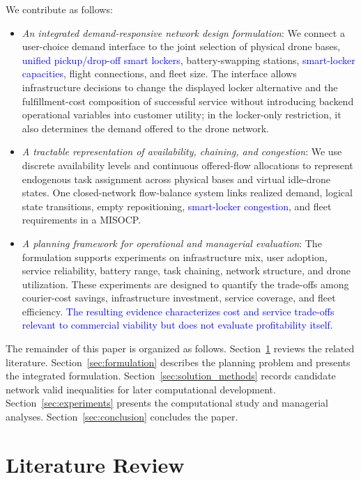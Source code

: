 \documentclass[final,3p,authoryear]{elsarticle}
\begin{document}
\color{black}
We contribute as follows:
\begin{itemize}
    \item \textit{An integrated demand-responsive network design formulation}:
    We connect a user-choice demand interface to the joint selection of physical drone bases, \textcolor{blue}{unified pickup/drop-off smart lockers}, battery-swapping stations, \textcolor{blue}{smart-locker capacities}, flight connections, and fleet size.
    The interface allows infrastructure decisions to change the displayed locker alternative and the fulfillment-cost composition of successful service without introducing backend operational variables into customer utility; in the locker-only restriction, it also determines the demand offered to the drone network.
    \item \textit{A tractable representation of availability, chaining, and congestion}:
    We use discrete availability levels and continuous offered-flow allocations to represent endogenous task assignment across physical bases and virtual idle-drone states.
    One closed-network flow-balance system links realized demand, logical state transitions, empty repositioning, \textcolor{blue}{smart-locker congestion}, and fleet requirements in a MISOCP.
    \item \textit{A planning framework for operational and managerial evaluation}:
    The formulation supports experiments on infrastructure mix, user adoption, service reliability, battery range, task chaining, network structure, and drone utilization.
    These experiments are designed to quantify the trade-offs among courier-cost savings, infrastructure investment, service coverage, and fleet efficiency.
    \textcolor{blue}{The resulting evidence characterizes cost and service trade-offs relevant to commercial viability but does not evaluate profitability itself.}

\end{itemize}

The remainder of this paper is organized as follows.
Section~\ref{sec:literature_review} reviews the related literature.
Section~\ref{sec:formulation} describes the planning problem and presents the integrated formulation.
Section~\ref{sec:solution_methods} records candidate network valid inequalities for later computational development.
Section~\ref{sec:experiments} presents the computational study and managerial analyses.
Section~\ref{sec:conclusion} concludes the paper.


\section{Literature Review}
\label{sec:literature_review}
\end{document}
